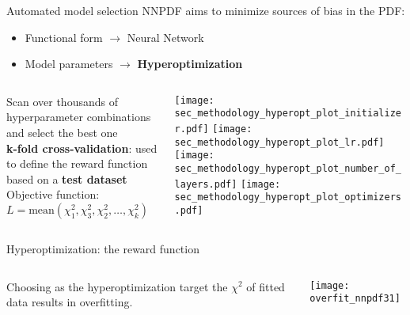 \begin{frame}[t]{Automated model selection}
	NNPDF aims to minimize sources of bias in the PDF:
	\begin{itemize}
	    \item Functional form $\rightarrow$ Neural Network
	    \item Model parameters $\rightarrow$ \textbf{Hyperoptimization}
	\end{itemize}
    \begin{columns}
        \begin{column}{0.48\textwidth}
            Scan over thousands of hyperparameter combinations and select the best one \\
            \vspace*{0.8em}
            {\bf k-fold cross-validation}: used to define the reward function based on a {\bf test dataset}\\ 
            \vspace*{0.8em}
            Objective function: \\
            $L=\textrm{mean}(\chi_1^2,\chi_3^2,\chi_2^2,\ldots, \chi_k^2)$
        \end{column}
        \begin{column}{0.48\textwidth}
            \begin{center}
                \texttt{[image: sec\_methodology\_hyperopt\_plot\_initializer.pdf]}
                \texttt{[image: sec\_methodology\_hyperopt\_plot\_lr.pdf]} \\
                \texttt{[image: sec\_methodology\_hyperopt\_plot\_number\_of\_layers.pdf]}
                \texttt{[image: sec\_methodology\_hyperopt\_plot\_optimizers.pdf]}
            \end{center}
        \end{column}
    \end{columns}
\end{frame}



\begin{frame}[t]{Hyperoptimization: the reward function}
    \begin{columns}[T]
        \begin{column}{0.48\textwidth}
            \vspace{\topsep}
            Choosing as the hyperoptimization target the $\chi^2$ of fitted data results in overfitting.
        \end{column}
        \begin{column}{0.48\textwidth}
            \texttt{[image: overfit\_nnpdf31]}
        \end{column}
    \end{columns}
\end{frame}



